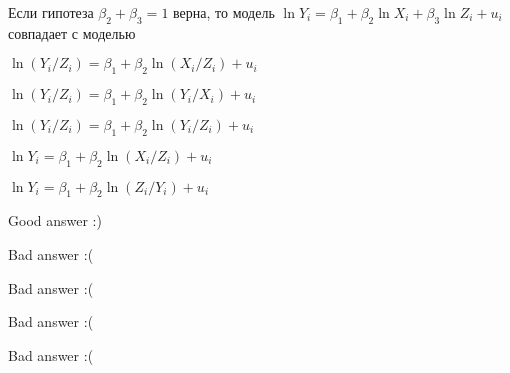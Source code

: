 
\begin{question}
Если гипотеза \(\beta_2 + \beta_3 = 1\) верна, то модель \(\ln Y_i = \beta_1 + \beta_2 \ln X_i + \beta_3 \ln Z_i + u_i\) совпадает с моделью
\begin{answerlist}
  \item \(\ln (Y_i/Z_i) = \beta_1 + \beta_2 \ln (X_i/Z_i) + u_i\)
  \item \(\ln (Y_i/Z_i) = \beta_1 + \beta_2 \ln (Y_i/X_i) + u_i\)
  \item \(\ln (Y_i/Z_i) = \beta_1 + \beta_2 \ln (Y_i/Z_i) + u_i\)
  \item \(\ln Y_i = \beta_1 + \beta_2 \ln (X_i/Z_i) + u_i\)
  \item \(\ln Y_i = \beta_1 + \beta_2 \ln (Z_i/Y_i) + u_i\)
\end{answerlist}
\end{question}

\begin{solution}
\begin{answerlist}
  \item Good answer :)
  \item Bad answer :(
  \item Bad answer :(
  \item Bad answer :(
  \item Bad answer :(
\end{answerlist}
\end{solution}

